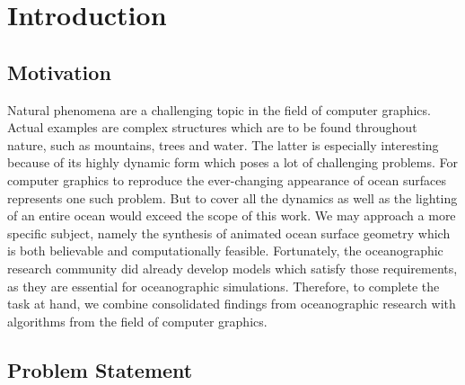 \chapter{Introduction}
\label{ch:intro}
%
\section{Motivation}
\label{sec:motivation}

Natural phenomena are a challenging topic in the field of computer graphics.
Actual examples are complex structures which are to be found throughout nature,
such as mountains, trees and water. The latter is especially interesting
because of its highly dynamic form which poses a lot of challenging problems.
For computer graphics to reproduce the ever-changing appearance of ocean
surfaces represents one such problem. But to cover all the dynamics as well
as the lighting of an entire ocean would exceed the scope of this work.
We may approach a more specific subject, namely the synthesis of animated ocean
surface geometry which is both believable and computationally feasible.
Fortunately, the oceanographic research community did already develop models
which satisfy those requirements, as they are essential for oceanographic
simulations. Therefore, to complete the task at hand, we combine consolidated
findings from oceanographic research with algorithms from the field of computer
graphics.




% 
% 
% 

\section{Problem Statement}
\label{sec:problem_statement}

